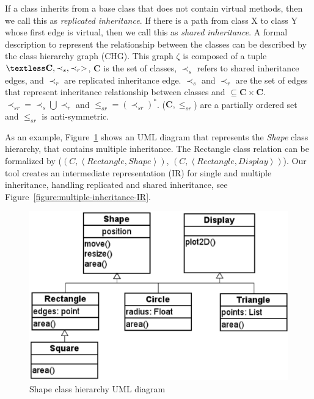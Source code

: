 \documentclass[a4paper]{llncs}
\begin{document}
If a class inherits from a base class that does not contain virtual methods,
then we call this as \textit{replicated inheritance}. If there is a path from
class X to class Y whose first edge is virtual, then we call this as \textit{shared inheritance}.
A formal description to represent the relationship between the classes
can be described by the class hierarchy graph (CHG). This graph $\zeta$ is composed of a tuple
$ \textless \textbf{C}, \prec_{s}, \prec_{r}>$, \textbf{C} is the set of classes,
$\prec_s $ refers to shared inheritance edges, and $\prec_r$ are replicated inheritance edge.
$\prec_{s}$ and $\prec_{r}$ are the set of edges that represent inheritance relationship between
classes and $\subseteq \textbf{C} \times \textbf{C}$.
$\prec_{sr} = \prec_s \bigcup \prec_r$ and $\leq_{sr} = (\prec_{sr})^*$. ($\textbf{C}, \leq_{sr}$)
are a partially ordered set and $\leq_{sr}$ is anti-symmetric.

As an example, Figure~\ref{figure:uml_diagram} shows an UML diagram
that represents the \textit{Shape} class hierarchy, that contains multiple inheritance.
The Rectangle class relation can be formalized by
($\left(C, \left\langle Rectangle, Shape \right\rangle \right)$,
$\left(C, \left\langle Rectangle, Display \right\rangle \right)$).
Our tool creates an intermediate representation (IR) for single and multiple inheritance, handling
replicated and shared inheritance, see Figure~\ref{figure:multiple-inheritance-IR}.

\begin{figure}[ht]
\centering
\includegraphics[scale=0.4]{figures/inheritance_uml}
\caption{Shape class hierarchy UML diagram}
\label{figure:uml_diagram}
\end{figure}
\end{document}
